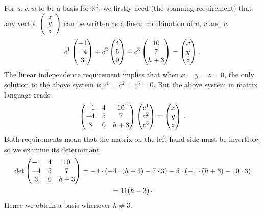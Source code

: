 \begin{enumerate}
For $u,v,w$ to be a basis for ${\mathbb R}^3$, we firstly need  (the spanning requirement) that any vector $\begin{pmatrix}x \\ y \\ z\end{pmatrix}$ can be written
as a linear combination of $u$, $v$ and $w$
\[
c^1 \begin{pmatrix}-1 \\ -4 \\ 3\end{pmatrix} + c^2 \begin{pmatrix}4 \\ 5 \\ 0\end{pmatrix} + c^3 \begin{pmatrix}\mc{10} \\ \mc{7} \\ h+3\end{pmatrix} = \begin{pmatrix}x \\ y \\ z\end{pmatrix}\, .
\]
The linear independence requirement implies that when $x=y=z=0$, the only solution to the above system is $c^1=c^2=c^3=0$.
But the above system in matrix language reads
\[
\begin{pmatrix}
-1 &4 &\mc{10} \\ -4 & 5 &\mc{7} \\ 3 & 0 & h+3
\end{pmatrix}
\begin{pmatrix}c^1 \\ c^2 \\ c^3\end{pmatrix}=\begin{pmatrix}x \\ y \\ z\end{pmatrix}\, .
\]
Both requirements mean that the matrix on the left hand side must be invertible, so we examine its determinant
\begin{gather*}
{\rm det} \begin{pmatrix}
-1 &4 &\mc{10} \\ -4 & 5 &\mc{7} \\ 3 & 0 & h+3
\end{pmatrix}
= -4\cdot (-4\cdot(h+3)-7\cdot3)+ 5\cdot(-1\cdot(h+3)-10\cdot3)\\=11(h-3)\, \cdot
\end{gather*}
Hence we obtain a basis whenever $h\neq 3$.

\end{enumerate}

\newpage
